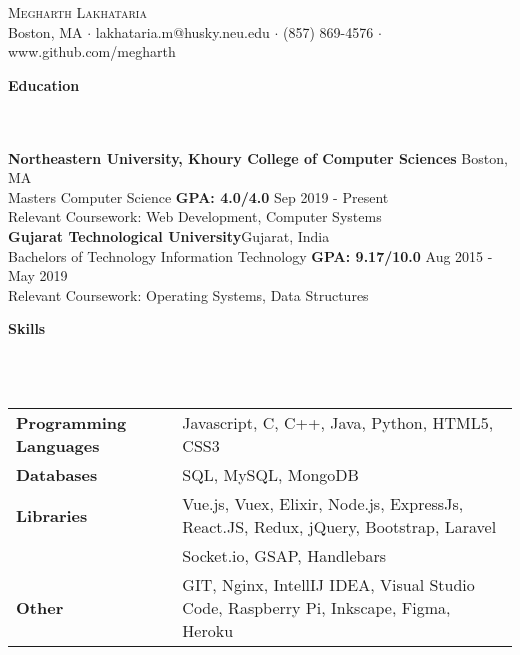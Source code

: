 \documentclass[]{article}
\newcommand{\lineunder} {
    \vspace*{-8pt} \\
    \hrulefill \\
}
\newcommand{\header} [1] {
    {\vspace*{6pt} \fontsize{12}{12}\selectfont \textbf{#1}}
     \lineunder
}
\begin{document}
\vspace*{-40pt}

    

\begin{center}
	{\LARGE \scshape {Megharth Lakhataria}}\\
	Boston, MA $\cdot$ lakhataria.m@husky.neu.edu $\cdot$ (857) 869-4576 $\cdot$ www.github.com/megharth\\
\end{center}

\header{Education}
\hspace{1mm}
\textbf{Northeastern University, Khoury College of Computer Sciences}
\hfill
Boston, MA\\
\hspace{1mm}
Masters Computer Science \textbf{GPA: 4.0/4.0} \hfill Sep 2019 - Present\\
\hspace{1mm}
Relevant Coursework: Web Development, Computer Systems \\
\vspace{2mm}
\hspace{1mm}
\textbf{Gujarat Technological University}\hfill Gujarat, India\\
\hspace{1mm}
Bachelors of Technology Information Technology \textbf{GPA: 9.17/10.0} \hfill
Aug 2015 - May 2019\\
\hspace{1mm}
Relevant Coursework: Operating Systems, Data Structures \\
\vspace{2mm}


\header{Skills}
\vspace{1mm}
\begin{tabular}{ l l }
	\textbf{Programming Languages} & Javascript, C, C++, Java, Python, HTML5, CSS3            \\
	\textbf{Databases}             & SQL, MySQL, MongoDB                                      \\
    
    \textbf{Libraries}             & Vue.js, Vuex, Elixir, Node.js, ExpressJs, React.JS,
    Redux, jQuery, Bootstrap, Laravel  \\
                          & Socket.io, GSAP, Handlebars \\
    
    \textbf{Other}                & GIT, Nginx, IntellIJ IDEA, Visual Studio Code,
    Raspberry Pi, Inkscape, Figma, Heroku \\          
\end{tabular}
\vspace{2mm}
\end{document}
